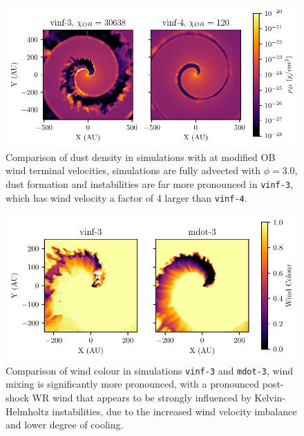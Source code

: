 




\begin{figure}
  \centering
  \includegraphics{assets/results/vinf/vinf-rhod.pdf}
  \caption[OB terminal velocity wind dust comparison]{Comparison of dust density in simulations with at modified OB wind terminal velocities, simulations are fully advected with $\phi = 3.0$, dust formation and instabilities are far more pronounced in \texttt{vinf-3}, which has wind velocity a factor of 4 larger than \texttt{vinf-4}.}
  \label{fig:obvinfzcomp}
\end{figure}

\begin{figure}
  \centering
  \includegraphics{assets/results/mixed/eta-004-comparison-r0.pdf}
  \caption[Wind colour comparison of $\eta = 0.04$ winds]{Comparison of wind colour in simulations \texttt{vinf-3} and \texttt{mdot-3}, wind mixing is significantly more pronounced, with a pronounced post-shock WR wind that appears to be strongly influenced by Kelvin-Helmholtz instabilities, due to the increased wind velocity imbalance and lower degree of cooling.}
  \label{fig:eta004comparisoncolour}
\end{figure}

